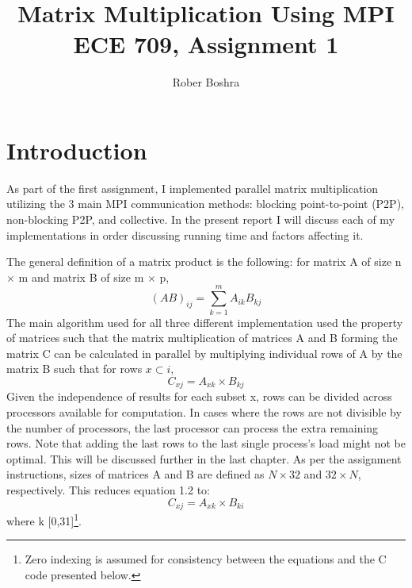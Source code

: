 \documentclass[12pt]{report}
\author{Rober Boshra}
\title{Matrix Multiplication Using MPI\\ECE 709, Assignment 1}
\begin{document}
 

\maketitle
\chapter{Introduction}
As part of the first assignment, I implemented parallel matrix multiplication utilizing the 3 main MPI communication methods: blocking point-to-point (P2P), non-blocking P2P, and collective. In the present report I will discuss each of my implementations in order discussing running time and factors affecting it.

The general definition of a matrix product is the following: for matrix A of size n $\times$ m and matrix B of size m $\times$ p, 
\begin{equation}
(AB)_{ij}=\sum\limits_{k=1}^m A_{ik}B_{kj}
\end{equation}
The main algorithm used for all three different implementation used the property of matrices such that the matrix multiplication of matrices A and B forming the matrix C can be calculated in parallel by multiplying individual rows of A by the matrix B such that for rows $x \subset i$,
\begin{equation}
C_{xj} = A_{xk} \times B_{kj}
\end{equation}
Given the independence of results for each subset x, rows can be divided across processors available for computation. In cases where the rows are not divisible by the number of processors, the last processor can process the extra remaining rows. Note that adding the last rows to the last single process's load might not be optimal. This will be discussed further in the last chapter. 
As per the assignment instructions, sizes of matrices A and B are defined as $N \times 32$ and $32 \times N$, respectively. This reduces equation 1.2 to:
\begin{equation}
C_{xj} = A_{xk} \times B_{ki}
\end{equation}
where k [0,31]\footnote{\label{^1}Zero indexing is assumed for consistency between the equations and the C code presented below.}.
\end{document}
